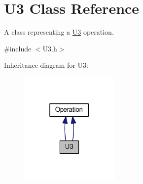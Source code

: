 \hypertarget{class_u3}{}\section{U3 Class Reference}
\label{class_u3}


A class representing a \hyperlink{class_u3}{U3} operation.  




{\ttfamily \#include $<$U3.\+h$>$}



Inheritance diagram for U3\+:
\nopagebreak
\begin{figure}[H]
\begin{center}
\leavevmode
\includegraphics[width=139pt]{class_u3__inherit__graph}
\end{center}
\end{figure}
